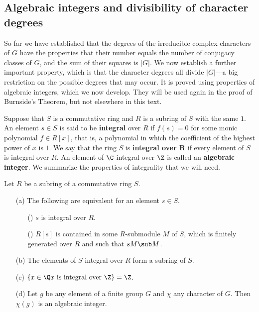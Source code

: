 \subsection{Algebraic integers and divisibility of character degrees}
So far we have established that the degrees of the irreducible complex characters of $G$ have the properties that their number equals the number of conjugacy classes of $G$, and the sum of their squares is $|G|$. We now establish a further important property, which is that the character degrees all divide $|G|$---a big restriction on the possible degrees that may occur. It is proved using properties of algebraic integers, which we now develop. They will be used again in the proof of Burnside's Theorem, but not elsewhere in this text.\par
Suppose that $S$ is a commutative ring and $R$ is a subring of $S$ with the same $1$. An element $s\in S$ is said to be \textbf{integral} over $R$ if $f(s)=0$ for some monic polynomial $f\in R[x]$, that is, a polynomial in which the coefficient of the highest power of $x$ is $1$. We say that the ring $S$ is \textbf{integral over $\bm{R}$} if every element of $S$ is integral over $R$. An element of $\C$ integral over $\Z$ is called an \textbf{algebraic integer}. We summarize the properties of integrality that we will need.
\begin{proposition}\label{algebraic integer prop}
Let $R$ be a subring of a commutative ring $S$.
\begin{itemize}
\item[(a)] The following are equivalent for an element $s\in S$.
\begin{itemize}
    \item[(\rmnum{1})] $s$ is integral over $R$.
    \item[(\rmnum{2})] $R[s]$ is contained in some $R$-submodule $M$ of $S$, which is finitely generated over $R$ and such that $sM\sub M$.
\end{itemize} 
\item[(b)] The elements of $S$ integral over $R$ form a subring of $S$.
\item[(c)] $\{x\in\Q\text{$x$ is integral over $\Z$}\}=\Z$.
\item[(d)] Let $g$ be any element of a finite group $G$ and $\chi$ any character of $G$. Then $\chi(g)$ is an algebraic integer.
\end{itemize}
\end{proposition}
